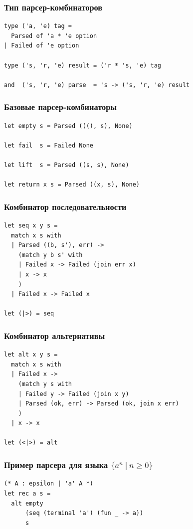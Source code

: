\documentclass{beamer}
\begin{document}
\begin{frame}[containsverbatim]
  \transwipe[direction=90]
  \frametitle{Тип парсер-комбинаторов}
  
\begin{lstlisting}[frame=single]  
type ('a, 'e) tag =
  Parsed of 'a * 'e option
| Failed of 'e option

type ('s, 'r, 'e) result = ('r * 's, 'e) tag

and  ('s, 'r, 'e) parse  = 's -> ('s, 'r, 'e) result
\end{lstlisting}
\end{frame}


\begin{frame}[fragile]
  \transwipe[direction=90]
  \frametitle{Базовые парсер-комбинаторы}  
\begin{lstlisting}[frame=single]  
let empty s = Parsed (((), s), None)

let fail  s = Failed None

let lift  s = Parsed ((s, s), None)

let return x s = Parsed ((x, s), None)
\end{lstlisting}
\end{frame}

\begin{frame}[fragile]
  \transwipe[direction=90]
  \frametitle{Комбинатор последовательности}  
\begin{lstlisting}[frame=single]  
let seq x y s =
  match x s with
  | Parsed ((b, s'), err) ->
    (match y b s' with
    | Failed x -> Failed (join err x)
    | x -> x
    )
  | Failed x -> Failed x

let (|>) = seq
\end{lstlisting}
\end{frame}


\begin{frame}[fragile]
  \transwipe[direction=90]
  \frametitle{Комбинатор альтернативы}  
\begin{lstlisting}[frame=single]  
let alt x y s =
  match x s with
  | Failed x ->
    (match y s with
    | Failed y -> Failed (join x y)
    | Parsed (ok, err) -> Parsed (ok, join x err)
    )
  | x -> x

let (<|>) = alt
\end{lstlisting}
\end{frame}


\begin{frame}[fragile]
  \transwipe[direction=90]
  \frametitle{Пример парсера для языка $\{ a^n \ | \ n \geq 0 \}$}  
\begin{lstlisting}[frame=single]  
(* A : epsilon | 'a' A *)
let rec a s = 
  alt empty 
      (seq (terminal 'a') (fun _ -> a)) 
      s
\end{lstlisting}
\end{frame}
\end{document}
